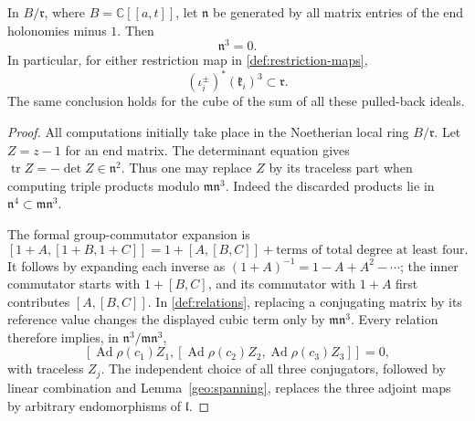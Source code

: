 \begin{proposition}
\label{def:cubic-nilpotence}
In \(B/\mathfrak r\), where \(B=\mathbb C[[a,t]]\), let
\(\mathfrak n\) be generated by all matrix entries of the end
holonomies minus \(1\).  Then
\begin{equation}
 \mathfrak n^3=0.
 \label{def:n-cube}
\end{equation}
In particular, for either restriction map in
\eqref{def:restriction-maps},
\begin{equation}
 (\iota_i^\pm)^*(\mathfrak k_i)^3\subset\mathfrak r .
 \label{def:k-cube}
\end{equation}
The same conclusion holds for the cube of the sum of all these
pulled-back ideals.
\end{proposition}

\begin{proof}
All computations initially take place in the Noetherian local
ring \(B/\mathfrak r\).  Let \(Z=z-1\) for an end matrix.  The
determinant equation gives
\(\operatorname{tr}Z=-\det Z\in\mathfrak n^2\).
Thus one may replace \(Z\) by its traceless part when computing
triple products modulo \(\mathfrak m\mathfrak n^3\).
Indeed the discarded products lie in
\(\mathfrak n^4\subset\mathfrak m\mathfrak n^3\).

The formal group-commutator expansion is
\[
 [1+A,[1+B,1+C]]
     =1+[A,[B,C]]+\text{terms of total degree at least four}.
\]
It follows by expanding each inverse as
\((1+A)^{-1}=1-A+A^2-\cdots\); the inner commutator starts with
\(1+[B,C]\), and its commutator with \(1+A\) first contributes
\([A,[B,C]]\).  In \eqref{def:relations}, replacing a conjugating
matrix by its reference value changes the displayed cubic term
only by \(\mathfrak m\mathfrak n^3\).  Every relation therefore
implies, in \(\mathfrak n^3/\mathfrak m\mathfrak n^3\),
\[
 [\operatorname{Ad}\rho(c_1)Z_1,
   [\operatorname{Ad}\rho(c_2)Z_2,
    \operatorname{Ad}\rho(c_3)Z_3]]=0,
\]
with traceless \(Z_j\).
The independent choice of all three conjugators, followed by
linear combination and Lemma~\ref{geo:spanning}, replaces the three
adjoint maps by arbitrary endomorphisms of \(\mathfrak l\).


\end{proof}
